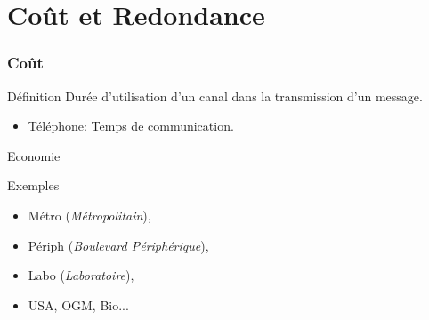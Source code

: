 \section{Coût et Redondance}

\begin{frame}
	\frametitle{Coût}
	\begin{block}{Définition}
		Durée d'utilisation d'un canal dans la transmission d'un message.
		\begin{itemize}
			\item Téléphone: Temps de communication.
		\end{itemize}
	\end{block}
	\pause
	\begin{alertblock}{Economie}
		\centering
	\end{alertblock}
	\pause
	\begin{exampleblock}{Exemples}
		\begin{itemize}
			\item Métro (\emph{Métropolitain}),
			\item Périph (\emph{Boulevard Périphérique}),
			\item Labo (\emph{Laboratoire}),
			\item USA, OGM, Bio...
		\end{itemize}
	\end{exampleblock}
\end{frame}

